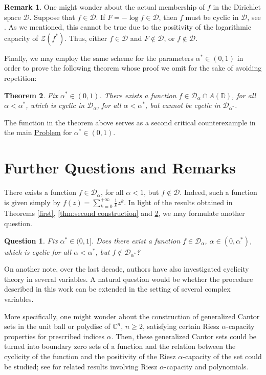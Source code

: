 \documentclass[12pt]{amsart}
\newtheorem{theorem}{Theorem}[section]
\newtheorem*{question*}{Question}
\theoremstyle{definition}\newtheorem{remark}[theorem]{Remark}
\theoremstyle{definition}\newtheorem{example}[theorem]{Example}
\theoremstyle{definition}\newtheorem{definition}{Definition}
\numberwithin{equation}{section}
\newcommand\cD{{\mathcal D}}
\newcommand\CC{{\mathbb C}}
\newcommand\DD{{\mathbb D}}
\newcommand\DDD{{\mathcal D}}
\begin{document}
\begin{remark}\label{r}
One might wonder about the actual membership of $f$ in the Dirichlet space $\mathcal{D}$. Suppose that $f\in \mathcal{D}$. If $F=-\log f\in \mathcal{D}$, then $f$ must be cyclic in $\mathcal{D}$, see \cite[Theorem 4.4]{Extrem polyn}. As we mentioned, this cannot be true due to the positivity of the logarithmic capacity of $\mathcal{Z}(f^*)$. Thus, either $f\in \mathcal{D}$ and $F\notin\mathcal{{D}}$, or $f\notin\mathcal{D}$.
\end{remark}

Finally, we may employ the same scheme for the parameters $\alpha^*\in(0,1)$ in order to prove the following theorem whose proof we omit for the sake of avoiding repetition:

\begin{theorem}\label{thm:second construction for a}
Fix $\alpha^*\in (0,1)$. There exists a function $f\in \cD_\alpha\cap A(\DD)$, for all $\alpha<\alpha^*$, which is cyclic in $\cD_\alpha$, for all $\alpha<\alpha^*$, but cannot be cyclic in $\DDD_{\alpha^*}$.
\end{theorem}

The function in the theorem above serves as a second critical counterexample in the main \hyperref[Problem]{Problem} for $\alpha^*\in (0,1)$.

\section{Further Questions and Remarks}
There exists a function $f\in \DDD_\alpha$, for all $\alpha<1$, but $f\notin\DDD$. Indeed, such a function is given simply by $f(z)=\sum_{k=0}^{+\infty}\frac{1}{k}z^k$. In light of the results obtained in Theorems \ref{first}, \ref{thm:second construction} and \ref{thm:second construction for a}, we may formulate another question.

\begin{question*}
Fix $\alpha^*\in (0,1]$. Does there exist a function $f\in \DDD_\alpha$, $\alpha\in (0,\alpha^*)$, which is cyclic for all $\alpha<\alpha^*$, but $f\notin\DDD_{\alpha^*}$?  
\end{question*}

On another note, over the last decade, authors have also investigated cyclicity theory in several variables. A natural question would be whether the procedure described in this work can be extended in the setting of several complex variables. 

More specifically, one might wonder about the construction of generalized Cantor sets in the unit ball or polydisc of $\CC^n$, $n\ge2$, satisfying certain Riesz $\alpha$-capacity properties for prescribed indices $\alpha$. Then, these generalized Cantor sets could be turned into boundary zero sets of a function and the relation between the cyclicity of the function and the positivity of the Riesz $\alpha$-capacity of the set could be studied; see \cite{Chalmoukis1, Chalmoukis, Vavitsas1,  Vavitsas-Zarvalis} for related results involving Riesz $\alpha$-capacity and polynomials. 
\end{document}

